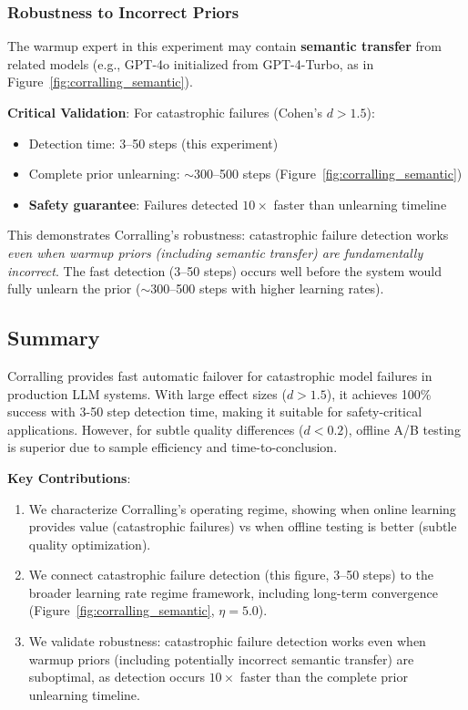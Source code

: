 \subsubsection{Robustness to Incorrect Priors}

The warmup expert in this experiment may contain \textbf{semantic transfer} from related models (e.g., GPT-4o initialized from GPT-4-Turbo, as in Figure~\ref{fig:corralling_semantic}).

\textbf{Critical Validation}: For catastrophic failures (Cohen's $d > 1.5$):
\begin{itemize}
    \item Detection time: 3--50 steps (this experiment)
    \item Complete prior unlearning: $\sim$300--500 steps (Figure~\ref{fig:corralling_semantic})
    \item \textbf{Safety guarantee}: Failures detected $10\times$ faster than unlearning timeline
\end{itemize}

This demonstrates Corralling's robustness: catastrophic failure detection works \emph{even when warmup priors (including semantic transfer) are fundamentally incorrect}. The fast detection (3--50 steps) occurs well before the system would fully unlearn the prior ($\sim$300--500 steps with higher learning rates).

\subsection{Summary}

Corralling provides fast automatic failover for catastrophic model failures in production LLM systems. With large effect sizes ($d > 1.5$), it achieves 100\% success with 3-50 step detection time, making it suitable for safety-critical applications. However, for subtle quality differences ($d < 0.2$), offline A/B testing is superior due to sample efficiency and time-to-conclusion.

\textbf{Key Contributions}: 
\begin{enumerate}
    \item We characterize Corralling's operating regime, showing when online learning provides value (catastrophic failures) vs when offline testing is better (subtle quality optimization).
    \item We connect catastrophic failure detection (this figure, 3--50 steps) to the broader learning rate regime framework, including long-term convergence (Figure~\ref{fig:corralling_semantic}, $\eta=5.0$).
    \item We validate robustness: catastrophic failure detection works even when warmup priors (including potentially incorrect semantic transfer) are suboptimal, as detection occurs $10\times$ faster than the complete prior unlearning timeline.
\end{enumerate}

